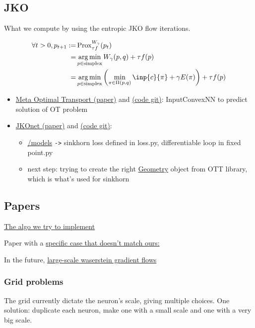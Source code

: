
\subsection{JKO}

What we compute by using the entropic JKO flow iterations.

\begin{align}
	\forall t > 0, p_{t+1} := & \prox^{W_{\gamma}}_{\tau f}(p_t) \\
							= & \argmin_{p \in \text{simplex}} W_{\gamma}(p, q) + \tau f(p) \\
							= &\argmin_{p \in \text{simplex}}  \left( \min_{\pi \in \Pi(p, q)} \inp{c}{\pi} + \gamma E(\pi) \right) + \tau f(p)
\end{align}


\begin{itemize}
	\item \href{https://arxiv.org/pdf/2206.05262.pdf}{Meta Optimal Transport (paper)} and \href{https://github.com/facebookresearch/meta-ot}{(code git)}: InputConvexNN to predict solution of OT problem
	\item \href{https://arxiv.org/pdf/2106.06345.pdf}{JKOnet (paper)} and \href{https://github.com/bunnech/jkonet}{(code git)}:
		\begin{itemize}
			\item \href{https://github.com/bunnech/jkonet/tree/main/jkonet/models}{/models} \verb|->| sinkhorn loss defined in loss.py, differentiable loop in fixed point.py
			\item next step: trying to create the right \href{https://ott-jax.readthedocs.io/en/latest/_autosummary/ott.geometry.geometry.Geometry.html#ott.geometry.geometry.Geometry}{Geometry} object from OTT library, which is what's used for sinkhorn
		\end{itemize}
\end{itemize}

\subsection{Papers}

\href{https://arxiv.org/pdf/1502.06216.pdf}{The algo we try to implement}

Paper with a \href{https://arxiv.org/pdf/1512.02783.pdf}{specific case that doesn't match ours:} 

In the future, \href{https://arxiv.org/pdf/2106.00736.pdf}{large-scale waserstein gradient flows}

\subsubsection{Grid problems}

The grid currently dictate the neuron's scale, giving multiple choices. One solution: duplicate each neuron, make one with a small scale and one with a very big scale.


